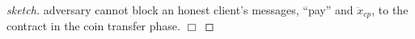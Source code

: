 \begin{proof}[sketch]
adversary cannot block an honest client's  messages, ``pay'' and $\ddot{x}_{\scriptscriptstyle cp}$, to the contract in the coin transfer phase.
  \hfill\(\Box\)\end{proof}

